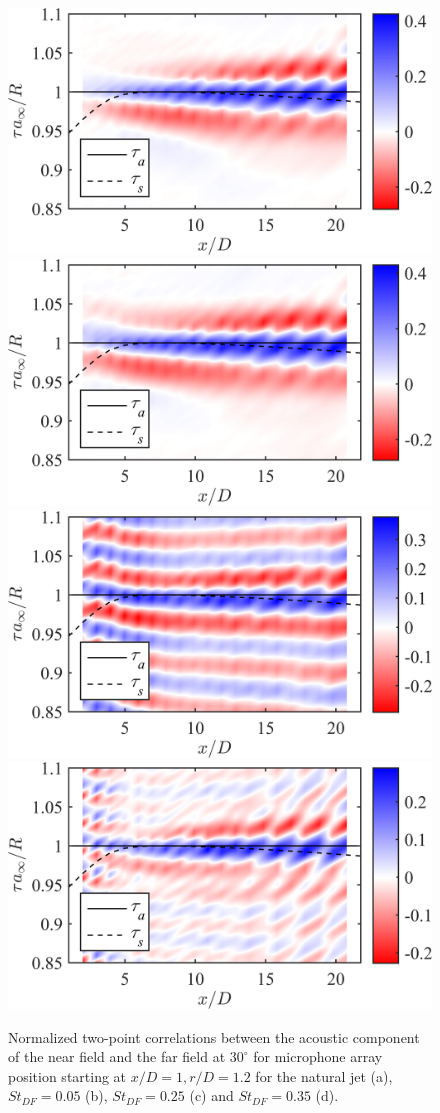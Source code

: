 \begin{figure}
	\centering
		\includegraphics[width=0.45\linewidth]{Figures/St000_r120_ff30xcor_xcor_oa.png}
		\includegraphics[width=0.45\linewidth]{Figures/St005_r120_ff30xcor_xcor_oa.png}\\
		\includegraphics[width=0.45\linewidth]{Figures/St025_r120_ff30xcor_xcor_oa.png}
		\includegraphics[width=0.45\linewidth]{Figures/St035_r120_ff30xcor_xcor_oa.png}
	\caption{Normalized two-point correlations between the acoustic component of the near field and the far field at $30^\circ$ for microphone array position starting at $x/D = 1, r/D = 1.2$ for the natural jet (a), $St_{DF} = 0.05$ (b), $St_{DF} = 0.25$ (c) and $St_{DF} = 0.35$ (d).}
	\label{fig:ch3_xcorrOA}
\end{figure}

